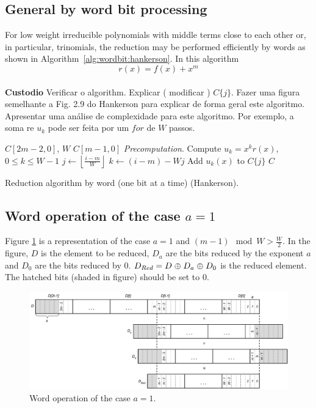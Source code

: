 \subsection{General by word bit processing}
For low weight irreducible polynomials with middle terms close to each other or, in particular, trinomials, the reduction may be performed efficiently by words as shown in Algorithm~\ref{alg:wordbit:hankerson}\cite[p. 53]{Hankerson}. In this algorithm $$r(x) = f(x) + x^m$$\\

{\bf Custodio} Verificar o algorithm. Explicar ( modificar ) $C\{j\}$. Fazer uma figura semelhante a Fig. 2.9 do Hankerson para explicar de forma geral este algoritmo. Apresentar uma análise de complexidade para este algoritmo. Por exemplo, a soma re $u_k$ pode ser feita por um $for$ de $W$ passos.

\begin{algorithm}
\begin{algorithmic}[1]
  \REQUIRE $C[2m-2,0]$, $W$
  \ENSURE $C[m-1,0]$
  {\it Precomputation}. Compute $u_k = x^k r(x)$, $0 \leq k \leq W-1$ 
      \STATE $j \gets \left \lfloor \frac{i-m}{W} \right \rfloor$
      \STATE $k \gets (i-m) - Wj$
      Add $u_k(x)$ to $C\{j\}$
    \ENDIF
  \ENDFOR
  \RETURN $C$
  \caption{Reduction algorithm by word (one bit at a time) (Hankerson).}
  \label{alg:wordbit:hankerson}
\end{algorithmic}
\end{algorithm}

\subsection{Word operation of the case $a=1$}\label{sec:word:operation:alg:a1}
Figure \ref{fig:word:operation:alg:a1} is a representation of the case $a=1$ and $(m-1) \mod{W} > \frac{W}{2}$. In the figure, $D$ is the element to be reduced, $D_a$ are the bits reduced by the exponent $a$ and $D_0$ are the bits reduced by $0$. $D_{Red} = D \mathrel{\oplus} D_a \mathrel{\oplus} D_0$ is the reduced element. The hatched bits (shaded in figure) should be set to 0.
\begin{figure}[htb]
  \centering
  \includegraphics[width = \columnwidth]{figures/two-elements-reduction-a-1.pdf}
\caption{Word operation of the case $a=1$.}
\label{fig:word:operation:alg:a1}
\end{figure}
\\

